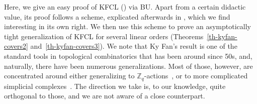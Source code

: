 \documentclass{article} %
\newcommand{\ZZ}{\mathbb{Z}}
\begin{document}
Here, we give an easy proof of KFCL () via BU. Apart from a certain didactic value, its proof follows a scheme, explicated afterwards in , which we find interesting in its own right. We then use this scheme to prove an asymptotically tight generalization of KFCL for several linear orders (Theorems~\ref{th-kyfan-covers2} and~\ref{th-kyfan-covers3}). We note that Ky Fan's result is one of the standard tools in topological combinatorics that has been around since 50s, and, naturally, there have been numerous generalizations. Most of those, however, are concentrated around either generalizing to $\ZZ_q$-actions~\cite{meunier06,ziegler02}, or to more complicated simplicial complexes~\cite{sarkaria90,zivaljevic10}. The direction we take is, to our knowledge, quite orthogonal to those, and we are not aware of a close counterpart.
\end{document}
